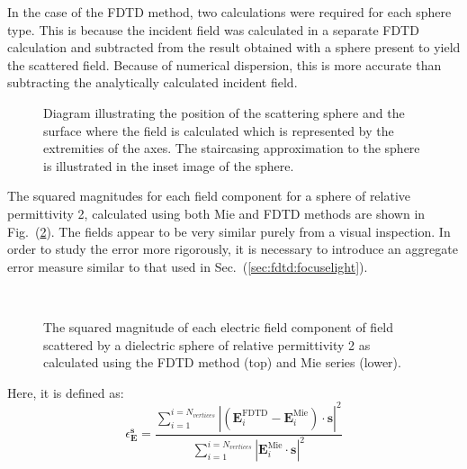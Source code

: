 \documentclass[a4paper, 12pt]{article}
\newcommand{\rfig}[1]{Fig.\ (\ref{#1})}
\newcommand{\sect}[1]{Sec.\ (\ref{#1})}
\begin{document}
	In the case of the FDTD method, two calculations were required for
	each sphere type. This is because the incident field was calculated in
	a separate FDTD calculation and subtracted from the result obtained
	with a sphere present to yield the scattered field. Because of
	numerical dispersion, this is more
	accurate than subtracting the analytically calculated incident field.
	\begin{figure}[!h]
		\begin{center}
			\caption{Diagram illustrating the position of the scattering sphere
				and the surface where the field is calculated which is represented
				by the extremities of the axes. The staircasing approximation to
				the sphere is illustrated in the inset image of the sphere.}
			\label{fig:fdtd:sphere_dims}
		\end{center}
	\end{figure}
	The squared magnitudes for each field component for a sphere of
	relative permittivity 2, calculated using both
	Mie and FDTD methods are shown in
	\rfig{fig:fdtd:scattered_field}. The fields appear to be very similar
	purely from a visual inspection. In order to study the error more
	rigorously, it is necessary to introduce an aggregate error measure
	similar to that used in \sect{sec:fdtd:focuselight}.
	\begin{figure}[!h]
		\begin{center}
			$\begin{array}{ccc}
			\end{array}$
			\caption{The squared magnitude of each electric field component of
				field scattered by a dielectric sphere of relative permittivity 2
				as calculated using the FDTD method (top) and Mie series (lower).}
			\label{fig:fdtd:scattered_field}
		\end{center}
	\end{figure}
	Here, it is defined as:
	\begin{equation}
		\epsilon_{\mathbf{E}}^{\mathbf{s}}=\frac{\sum\limits_{i=1}^{i=N_{vertices}}\left|\left(\mathbf{E}^{\textrm{FDTD}}_i-\mathbf{E}^{\textrm{Mie}}_i\right)\!\cdot\!\mathbf{s}\right|^2}{\sum\limits_{i=1}^{i=N_{vertices}}\left|\mathbf{E}^{\textrm{Mie}}_i\!\cdot\!\mathbf{s}\right|^2}
		\label{eq:fdtd:aggerr2}
	\end{equation}
\end{document}
